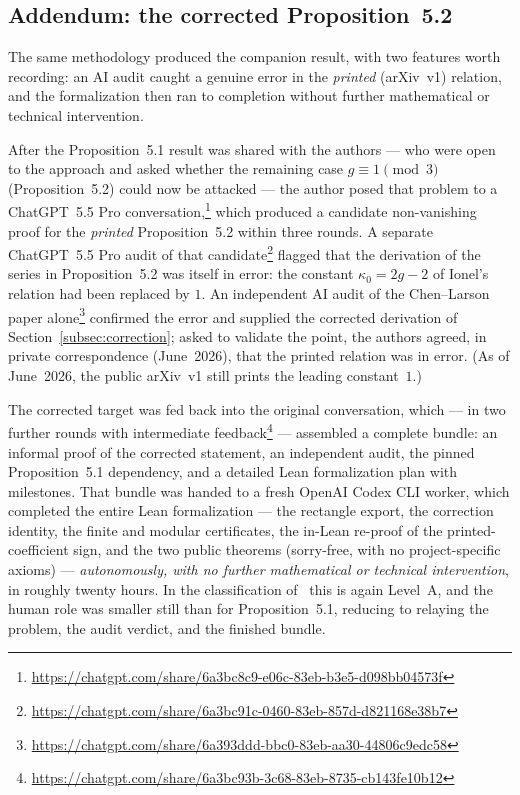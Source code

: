\documentclass[11pt]{article}
\theoremstyle{definition}
\theoremstyle{remark}
\begin{document}
\subsection{Addendum: the corrected Proposition~5.2}\label{subsec:ai52}

The same methodology produced the companion result, with two features worth
recording: an AI audit caught a genuine error in the \emph{printed} (arXiv~v1)
relation, and the formalization then ran to completion without further
mathematical or technical intervention.

After the Proposition~5.1 result was shared with the authors --- who were open to
the approach and asked whether the remaining case $g\equiv1\pmod3$
(Proposition~5.2) could now be attacked --- the author posed that problem to a
ChatGPT~5.5 Pro
conversation,\footnote{\url{https://chatgpt.com/share/6a3bc8c9-e06c-83eb-b3e5-d098bb04573f}}
which produced a candidate non-vanishing proof for the \emph{printed}
Proposition~5.2 within three rounds.  A separate ChatGPT~5.5 Pro audit of that
candidate\footnote{\url{https://chatgpt.com/share/6a3bc91c-0460-83eb-857d-d821168e38b7}}
flagged that the derivation of the series in Proposition~5.2 was itself in error:
the constant $\kappa_0=2g-2$ of Ionel's relation had been replaced by $1$.  An
independent AI audit of the Chen--Larson paper
alone\footnote{\url{https://chatgpt.com/share/6a393ddd-bbc0-83eb-aa30-44806c9edc58}}
confirmed the error and supplied the corrected derivation of
Section~\ref{subsec:correction}; asked to validate the point, the authors
agreed, in private correspondence (June~2026), that the printed relation was in
error.  (As of June~2026, the public arXiv~v1 still prints the leading
constant~$1$.)

The corrected target was fed back into the original conversation, which --- in
two further rounds with intermediate
feedback\footnote{\url{https://chatgpt.com/share/6a3bc93b-3c68-83eb-8735-cb143fe10b12}}
--- assembled a complete bundle: an informal proof of the corrected statement, an
independent audit, the pinned Proposition~5.1 dependency, and a detailed Lean
formalization plan with milestones.  That bundle was handed to a fresh OpenAI
Codex CLI worker, which completed the entire Lean formalization --- the rectangle
export, the correction identity, the finite and modular certificates, the
in-Lean re-proof of the printed-coefficient sign, and the two public theorems
(sorry-free, with no project-specific axioms) --- \emph{autonomously, with no
further mathematical or technical
intervention}, in roughly twenty hours.  In the classification
of~\cite{FengAletheia} this is again Level~A, and the human role was smaller still
than for Proposition~5.1, reducing to relaying the problem, the audit verdict, and
the finished bundle.
\end{document}
